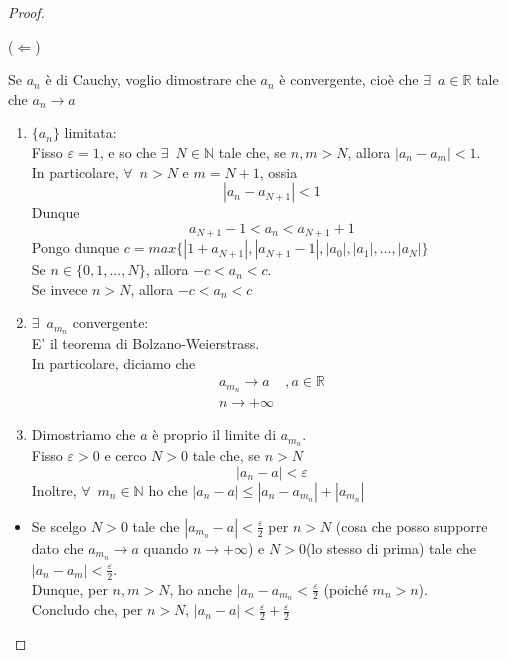 \documentclass{article}
\theoremstyle{definition}
\begin{document}
\begin{proof}
    \begin{center}
        ($\Leftarrow$)
    \end{center}
    Se $a_n$ è di Cauchy, voglio dimostrare che $a_n$ è convergente, cioè che $\exists \,\,\, a \in \mathbb{R}$ tale che $a_n \to a$
\begin{enumerate}
    \item $\{a_n\}$ limitata:
    \\
    Fisso $\varepsilon=1$, e so che $\exists \,\,\, N \in \mathbb{N}$ tale che, se $n,m>N$, allora $|a_n-a_m|<1$.
    \\
    In particolare, $\forall \,\,\, n>N$ e $m=N+1$, ossia
    \begin{equation}
        |a_n-a_{N+1}|<1
    \end{equation}
    Dunque
    \begin{equation}
        a_{N+1}-1<a_n<a_{N+1}+1
    \end{equation}
Pongo dunque $c=max\{|1+a_{N+1}|,|a_{N+1}-1|,|a_0|,|a_1|,...,|a_N|\}$
\\
Se $n \in \{0,1,...,N\}$, allora $-c<a_n<c$.
\\
Se invece $n>N$, allora $-c<a_n<c$ 
\item $\exists \,\,\, a_{m_n}$ convergente:
\\
E' il teorema di Bolzano-Weierstrass.
\\
In particolare, diciamo che
\begin{align*} 
a_{m_n} \to a &, a \in \mathbb{R}\\
n \to +\infty 
\end{align*}
\item Dimostriamo che $a$ è proprio il limite di $a_{m_n}$.
\\
Fisso $\varepsilon>0$ e cerco $N>0$ tale che, se $n>N$
\begin{equation}
    |a_n-a|<\varepsilon
\end{equation}
Inoltre, $\forall \,\,\, m_n \in \mathbb{N}$ ho che $|a_n-a|\leqslant|a_n-a_{m_n}|+|a_{m_n}|$
   
\end{enumerate}
\begin{itemize}
    \item Se scelgo $N>0$ tale che $|a_{m_n}-a|<\frac{\varepsilon}{2}$ per $n>N$ (cosa che posso supporre dato che $a_{m_n} \to a$ quando $n \to +\infty$) e $N>0$(lo stesso di prima) tale che $|a_n-a_m|<\frac{\varepsilon}{2}$.
    \\
    Dunque, per $n,m>N$, ho anche $|a_n-a_{m_n}<\frac{\varepsilon}{2}$ (poiché $m_n>n$).
    \\
    Concludo che, per $n>N$, $|a_n-a|<\frac{\varepsilon}{2}+\frac{\varepsilon}{2}$

\end{itemize}
    \end{proof}
\end{document}
